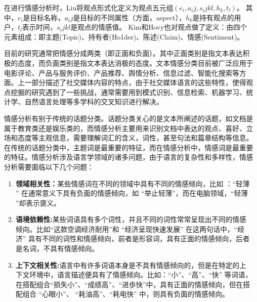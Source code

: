 在进行情感分析时，Liu将观点形式化定义为观点五元组$ (e_i,a_ij,s_ijkl,h_k,t_l)$。
其中，$ e_i $是目标名称，$ a_ij $是目标的不同属性（方面，aspect），$ h_k$是持有观点的用户，$ t_l$表示时间，$ s_ijkl$是观点的情感值。
Kim和Hovy也对观点做了定义：由四个元素组成：即主题(Topic)、持有者(Ho1der)、陈述(Claim)、情感(Sentiment)。

目前的研究通常把情感分成两类（即正面和负面）。其中正面类别是指文本表达积极的态度，而负面类别是指文本表达消极的态度。文本情感分类目前被广泛应用于电影评论、产品与服务评价、产品推荐、舆情分析、信息过滤、智能化搜索等方面。上一部分描述了社交媒体内容的特点，由于社交媒体语言的这些特性，使得观点挖掘的研究遇到了一些挑战，通常需要用到模式识别、信息检索、机器学习、统计学、自然语言处理等多学科的交叉知识进行解决。

情感分析有别于传统的话题分类。话题分类关心的是文本所阐述的话题，如文档是属于教育类还是娱乐类的，而情感分析主要用来识别文档中表达的观点、喜好、立场和态度等主观信息，需要理解词汇的含义，词性，甚至句法和篇章结构等信息。在传统的话题分类中，主题词是最重要的特征，而在情感分析中，情感词是最重要的特征。情感分析涉及语言学领域的诸多问题，由于语言的复杂性和多样性，情感分析需要面临以下几个问题：

\begin{enumerate}
\item \textbf{领域相关性：}某些情感词在不同的领域中具有不同的情感倾向，比如 ：``轻薄 '' 在通常意义下具有负面的情感倾向，如 ``举止轻薄''，而在电脑领域，``轻薄 ''却表示褒义。
\item \textbf{语境依赖性:}某些词语具有多个词性，并且不同的词性常常呈现出不同的情感倾向。比如``这款空调经济耐用''和 ``经济呈现快速发展'' 在这两句话中，``经济'' 具有不同的词性和情感倾向，前者是形容词，具有正面的情感倾向，后者是名词，不具有情感倾向。
\item \textbf{上下文相关性:}语言中有许多词语本身是不具有情感倾向的，但是在特定的上下文环境中，语言描述便具有了情感倾向。比如：``小''、``高''、``快'' 等词语，在搭配组合``损失小''、``成绩高''、``进歩快''中，具有正面的情感倾向，但在搭配组合 ``心眼小''、 ``耗油高''、``耗电快'' 中，则具有负面的情感倾向。
\end{enumerate}

